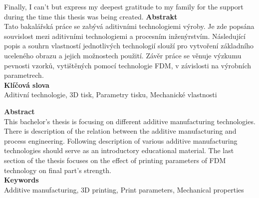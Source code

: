 \documentclass[a4paper, 11pt, reqno]{report}
\begin{document}
	
	Finally, I can't but express my deepest gratitude to my family for the support during the time this thesis was being created.
%
%
%
\newpage
\LARGE
\noindent
\textbf{Abstrakt}
\normalsize
\\[10pt]
Tato bakalářská práce se zabývá aditivními technologiemi výroby. Je zde popsána souvislost mezi aditivními technologiemi a procesním inženýrstvím. Následující popis a souhrn vlastností jednotlivých technologií slouží pro vytvoření základního uceleného obrazu a jejich možnostech použití. Závěr práce se věnuje výzkumu pevnosti vzorků, vytištěných pomocí technologie FDM, v závislosti na výrobních parametrech.
\\[20pt]

\Large
\noindent
\textbf{Klíčová slova}
\normalsize
\\[10pt]
Aditivní technologie, 3D tisk, Parametry tisku, Mechanické vlastnosti

\vfill
\LARGE
\noindent
\textbf{Abstract}
\normalsize
\\[10pt]
This bachelor's thesis is focusing on different additive manufacturing technologies. There is description of the relation between the additive manufacturing and process engineering. Following description of various additive manufacturing technologies should serve as an introductory educational material. The last section of the thesis focuses on the effect of printing parameters of FDM technology on final part's strength.
\\[20pt]

\Large
\noindent
\textbf{Keywords}
\normalsize
\\[10pt]
Additive manufacturing, 3D printing, Print parameters, Mechanical properties

\tableofcontents
\end{document}
